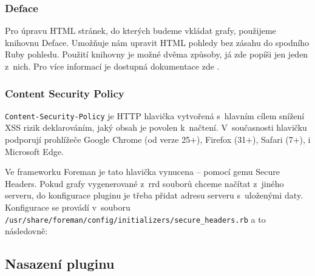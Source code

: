 \subsubsection{Deface}

Pro úpravu HTML stránek, do kterých budeme vkládat grafy, použijeme knihovnu Deface. Umožňuje nám upravit HTML pohledy bez zásahu do spodního Ruby pohledu. Použití knihovny je možné dvěma způsoby, já zde popíši jen jeden z~nich. Pro více informací je dostupná dokumentace zde \cite{deface}.


\subsubsection{Content Security Policy}

\texttt{Content-Security-Policy} je HTTP hlavička vytvořená s~hlavním cílem snížení XSS rizik deklarováním, jaký obsah je povolen k~načtení. V~současnosti hlavičku podporují prohlížeče Google Chrome (od verze 25+), Firefox (31+), Safari (7+), i Microsoft Edge.

Ve frameworku Foreman je tato hlavička vynucena -- pomocí gemu Secure Headers. Pokud grafy vygenerované z~rrd souborů chceme načítat z~jiného serveru, do konfigurace pluginu je třeba přidat adresu serveru s~uloženými daty. Konfigurace se provádí v~souboru \\\texttt{/usr/share/foreman/config/initializers/secure_headers.rb} a to následovně:







%
%
%
%
%
%
%



\subsection{Nasazení pluginu}

